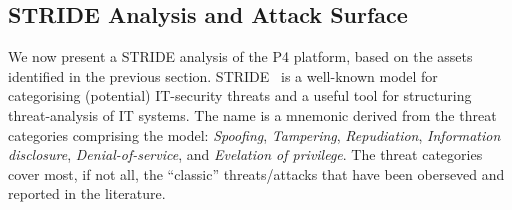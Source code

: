 \documentclass[10pt,sigconf]{acmart}
\newcommand{\madalin}[1]{\todo[inline,author={Madalin}]{#1}}
\begin{document}
\begin{comment}
\madalin{Maybe instead of this that only shows an overview of any SDN attack surface, make something that compares more like component level the attack surface between openflow and P4.}
For the following discussion, let us have a simple
network in mind with a single controller $c0$
which manages three
devices, a router $r1$ and two switches $s1$ and $s2$. 
The first switch connects two hosts
$h1$ and $h2$ while the second switch connects another two 
hosts $h3$ and $h4$.
See Figure~\ref{fig:overview-onos}. 
Points of attack are shown in the figure with 
devil horns indicating places from
which attacks can occur. There are three attack points identified 
$a1$, $a2$ and $a3$.
Attack point number $a1$ is located in the host 
$h1$ and represents an attacker that
has unrestricted access to a host in the network. 
Such an attacker can for example
flood the channel between the switch $s1$ 
and the controller $c0$ by sending packets to
$s1$ which would then be sent further to $c0$.
The second attack point is located on the channel 
between the controller $c0$ and
the switch $s1$ and represents an attacker having access to 
packets that travel through
this channel. Such an attacker can exploit the man-in-the-middle
type of attack
in order to read and modify control messages sent between the controller and the
switch. Also having access to the channel can be used for attacks involving spoofing
the controller.
Attack point $a3$ is shown to be in the controller $c0$ 
and represents an attacker
having somehow access to the controller. If the attacker only 
has connectivity access,
attacks such as brute force login can be used. If somehow the adversary manages
to have an application of his own installed on the controller the attacker could use vulnerabilities such as malicious applications.

\begin{figure}[tp]
\centering
\texttt{[image: overview]}
\caption{Overview of attack points}\label{fig:overview}
\end{figure}
\end{comment}

\subsection{STRIDE Analysis and Attack Surface}

We now present a STRIDE analysis of the P4 platform,
based on the assets identified in the previous section.
STRIDE~\cite{stride} is a well-known model for categorising (potential) IT-security
threats and a useful tool for structuring threat-analysis of IT
systems. The name is a mnemonic derived from the threat categories
comprising the model: \emph{Spoofing}, \emph{Tampering},
\emph{Repudiation}, \emph{Information disclosure},
\emph{Denial-of-service}, and \emph{Evelation of privilege}. The
threat categories cover most, if not all, the ``classic''
threats/attacks that have been oberseved and reported in the
literature.
\end{document}
